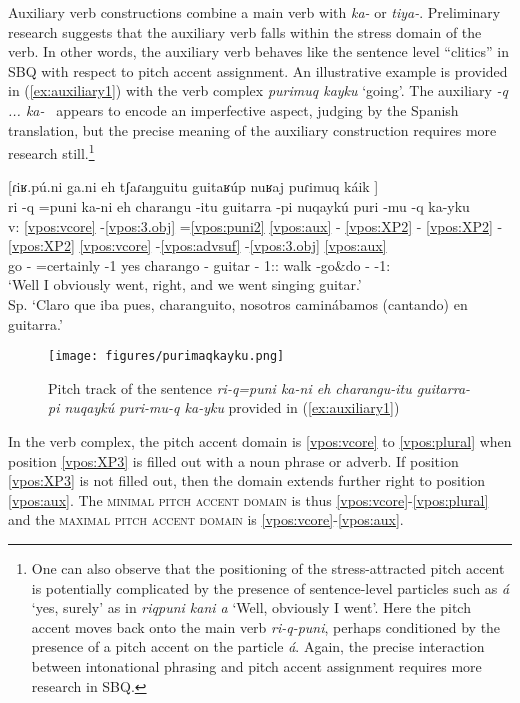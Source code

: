 \documentclass[output=paper]{langscibook}
\begin{document}
Auxiliary verb constructions combine a main verb with \textit{ka-} or \textit{tiya-}. Preliminary research suggests that the auxiliary verb falls within the stress domain of the verb. In other words, the auxiliary verb behaves like the sentence level ``clitics'' in SBQ with respect to pitch accent assignment. An illustrative example is provided in (\ref{ex:auxiliary1}) with the verb complex \textit{purimuq kayku} `going'. The auxiliary \textit{-q ... ka-}  appears to encode an imperfective aspect, judging by the Spanish translation, but the precise meaning of the auxiliary construction requires more research still.\footnote{One can also observe that the positioning of the stress-attracted pitch accent is potentially complicated by the presence of sentence-level particles such as \textit{á} `yes, surely' as in \textit{riqpuni kani a} `Well, obviously I went'. Here the pitch accent moves back onto the main verb \textit{ri-q-puni}, perhaps conditioned by the presence of a pitch accent on the particle \textit{á}. Again, the precise interaction between intonational phrasing and pitch accent assignment requires more research in SBQ.}


\ea \label{ex:auxiliary1}
    [\uparrow ɾiʁ.pú.ni ga.ni eh \uparrow tʃaɾaŋguitu guitaʁúp nuʁaj puɾimuq káik \downarrow] \\
    \glll{} ri -q =puni ka-ni eh charangu -itu guitarra -pi nuqaykú puri -mu -q ka-yku    \\
    v: \ref{vpos:vcore} -\ref{vpos:3.obj} =\ref{vpos:puni2} \ref{vpos:aux} - \ref{vpos:XP2} - \ref{vpos:XP2} - \ref{vpos:XP2} \ref{vpos:vcore} -\ref{vpos:advsuf} -\ref{vpos:3.obj} \ref{vpos:aux}        \\
    {} go -\Ipfv{} =certainly \Aux{}-1\Sg{} yes charango -\Dim{} guitar -\Loc{} 1\Pl{}:\Excl{}:\Top{} walk -go\&do -\Ipfv{} \Aux{}-1\Pl{}:\Excl{} \\
    \glt `Well I obviously went, right, and we went singing guitar.' \\ Sp. `Claro que iba pues, charanguito, nosotros caminábamos (cantando) en guitarra.'  
\z 

\begin{figure}
    \centering
    \texttt{[image: figures/purimaqkayku.png]}
    \caption{Pitch track of the sentence \textit{ri-q=puni ka-ni eh charangu-itu guitarra-pi nuqaykú puri-mu-q ka-yku} provided in (\ref{ex:auxiliary1})}
    \label{fig:purimaqkayku}
\end{figure}


In the verb complex, the pitch accent domain is \ref{vpos:vcore} to \ref{vpos:plural} when position \ref{vpos:XP3} is filled out with a noun phrase or adverb. If position \ref{vpos:XP3} is not filled out, then the domain extends further right to position \ref{vpos:aux}. The \textsc{minimal pitch accent domain} is thus \ref{vpos:vcore}-\ref{vpos:plural} and the \textsc{maximal pitch accent domain} is \ref{vpos:vcore}-\ref{vpos:aux}.
\end{document}
